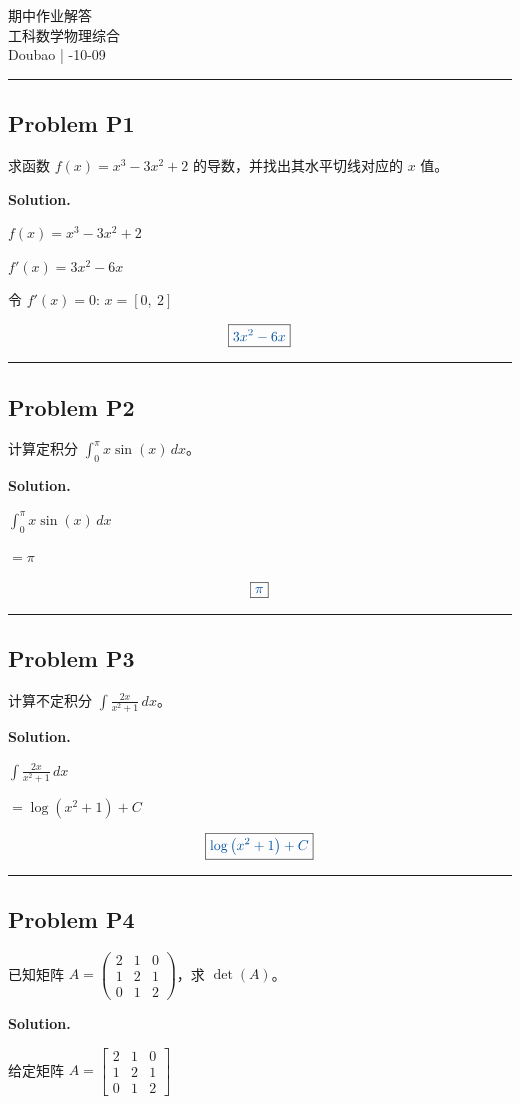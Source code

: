 \documentclass[11pt, a4paper]{ctexart}
\newcommand{\problem}[1]{\subsection*{Problem #1}}
\newcommand{\solution}{\par\noindent\textbf{Solution.}\par\smallskip}
\begin{document}
\begin{center}
  {\LARGE 期中作业解答}\\[0.4em]
  {\large 工科数学物理综合}\\[0.25em]
  Doubao \quad | -10-09
\end{center}

\hrule
\vspace{0.8em}
\problem{P1}

求函数 $f(x) = x^3 - 3x^2 + 2$ 的导数，并找出其水平切线对应的 $x$ 值。

\solution
$f(x) = x^{3} - 3 x^{2} + 2$

$f'(x) = 3 x^{2} - 6 x$

令 $f'(x)=0$: $x = \left[ 0, \  2\right]$

\[\boxed{\textcolor{anscolor}{3 x^{2} - 6 x}}\]

\vspace{0.6em}\hrule\vspace{0.6em}
\problem{P2}

计算定积分 $\int_0^{\pi} x \sin(x) \, dx$。

\solution
$\int_{0}^{\pi} x \sin{\left(x \right)}\,dx$

$= \pi$

\[\boxed{\textcolor{anscolor}{\pi}}\]

\vspace{0.6em}\hrule\vspace{0.6em}
\problem{P3}

计算不定积分 $\int \frac{2x}{x^2 + 1} \, dx$。

\solution
$\int \frac{2 x}{x^{2} + 1}\,dx$

$= \log{\left(x^{2} + 1 \right)} + C$

\[\boxed{\textcolor{anscolor}{\log{\left(x^{2} + 1 \right)} + C}}\]

\vspace{0.6em}\hrule\vspace{0.6em}
\problem{P4}

已知矩阵 $A = \begin{pmatrix} 2 & 1 & 0 \\ 1 & 2 & 1 \\ 0 & 1 & 2 \end{pmatrix}$，求 $\det(A)$。

\solution
给定矩阵 $A = \left[\begin{matrix}2 & 1 & 0\\1 & 2 & 1\\0 & 1 & 2\end{matrix}\right]$
\end{document}
